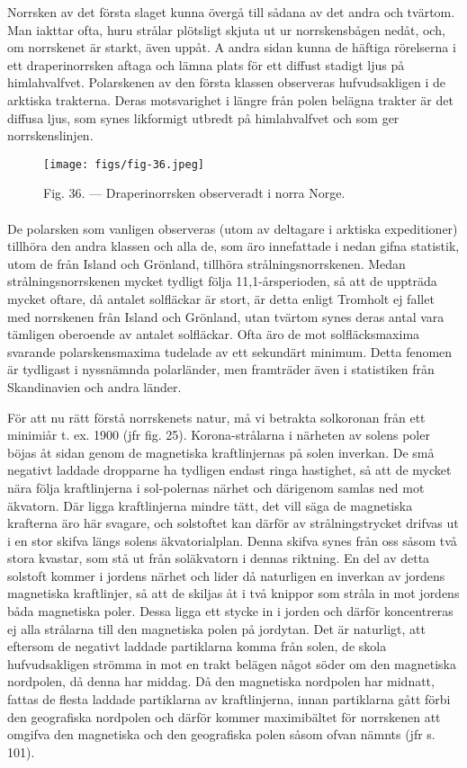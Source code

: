 \documentclass[a4paper, 12pt, oneside, swedish]{article}
\begin{document}
Norrsken av det första slaget kunna övergå till sådana av det andra och tvärtom. Man iakttar ofta, huru strålar plötsligt skjuta ut ur norrskensbågen nedåt, och, om norrskenet är starkt, även uppåt. A andra sidan kunna de häftiga rörelserna i ett draperinorrsken aftaga och lämna plats för ett diffust stadigt ljus på himlahvalfvet. Polarskenen av den första klassen observeras hufvudsakligen i de arktiska trakterna. Deras motsvarighet i längre från polen belägna trakter är det diffusa ljus, som synes likformigt utbredt på himlahvalfvet och som ger norrskenslinjen.

\begin{figure}[H]
\centering
\texttt{[image: figs/fig-36.jpeg]}
\caption{Fig. 36. --- Draperinorrsken observeradt i norra Norge.}
\end{figure}
\paragraph{}
De polarsken som vanligen observeras (utom av deltagare i arktiska expeditioner) tillhöra den andra klassen och alla de, som äro innefattade i nedan gifna statistik, utom de från Island och Grönland, tillhöra strålningsnorrskenen. Medan strålningsnorrskenen mycket tydligt följa 11,1-årsperioden, så att de uppträda mycket oftare, då antalet solfläckar är stort, är detta enligt Tromholt ej fallet med norrskenen från Island och Grönland, utan tvärtom synes deras antal vara tämligen oberoende av antalet solfläckar. Ofta äro de mot solfläcksmaxima svarande polarskensmaxima tudelade av ett sekundärt minimum. Detta fenomen är tydligast i nyssnämnda polarländer, men framträder även i statistiken från Skandinavien och andra länder.

För att nu rätt förstå norrskenets natur, må vi betrakta solkoronan från ett minimiår t. ex. 1900 (jfr fig. 25). Korona-strålarna i närheten av solens poler böjas åt sidan genom de magnetiska kraftlinjernas på solen inverkan. De små negativt laddade dropparne ha tydligen endast ringa hastighet, så att de mycket nära följa kraftlinjerna i sol-polernas närhet och därigenom samlas ned mot äkvatorn. Där ligga kraftlinjerna mindre tätt, det vill säga de magnetiska krafterna äro här svagare, och solstoftet kan därför av strålningstrycket drifvas ut i en stor skifva längs solens äkvatorialplan. Denna skifva synes från oss såsom två stora kvastar, som stå ut från soläkvatorn i dennas riktning. En del av detta solstoft kommer i jordens närhet och lider då naturligen en inverkan av jordens magnetiska kraftlinjer, så att de skiljas åt i två knippor som stråla in mot jordens båda magnetiska poler. Dessa ligga ett stycke in i jorden och därför koncentreras ej alla strålarna till den magnetiska polen på jordytan. Det är naturligt, att eftersom de negativt laddade partiklarna komma från solen, de skola hufvudsakligen strömma in mot en trakt belägen något söder om den magnetiska nordpolen, då denna har middag. Då den magnetiska nordpolen har midnatt, fattas de flesta laddade partiklarna av kraftlinjerna, innan partiklarna gått förbi den geografiska nordpolen och därför kommer maximibältet för norrskenen att omgifva den magnetiska och den geografiska polen såsom ofvan nämnts (jfr s. 101).
\end{document}

